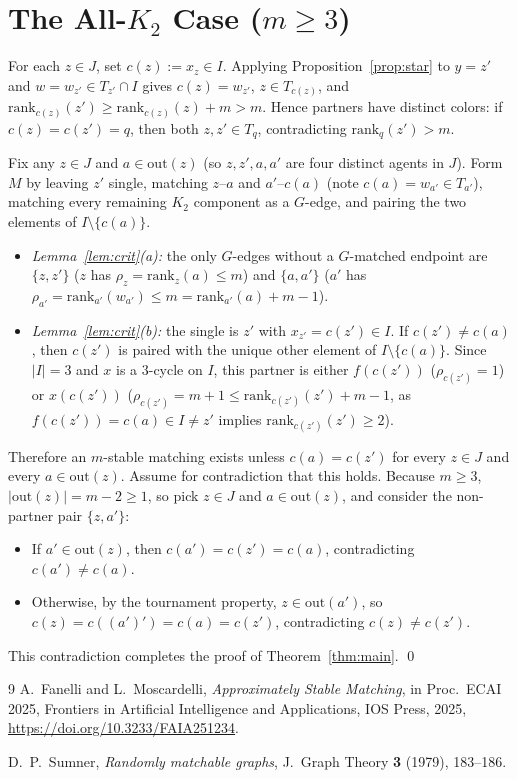 \documentclass[11pt]{article}
\begin{document}
\section{The All-$K_2$ Case ($m \ge 3$)}\label{sec:allk2}

For each $z \in J$, set $c(z) := x_z \in I$. Applying Proposition~\ref{prop:star} to $y = z'$ and $w = w_{z'} \in T_{z'} \cap I$ gives $c(z) = w_{z'}$, $z \in T_{c(z)}$, and $\mathrm{rank}_{c(z)}(z') \ge \mathrm{rank}_{c(z)}(z) + m > m$. Hence partners have distinct colors: if $c(z) = c(z') = q$, then both $z, z' \in T_q$, contradicting $\mathrm{rank}_q(z') > m$.

Fix any $z \in J$ and $a \in \mathrm{out}(z)$ (so $z, z', a, a'$ are four distinct agents in $J$). Form $M$ by leaving $z'$ single, matching $z\text{--}a$ and $a'\text{--}c(a)$ (note $c(a) = w_{a'} \in T_{a'}$), matching every remaining $K_2$ component as a $G$-edge, and pairing the two elements of $I \setminus \{c(a)\}$.
\begin{itemize}
  \item \emph{Lemma~\ref{lem:crit}(a):} the only $G$-edges without a $G$-matched endpoint are $\{z, z'\}$ ($z$ has $\rho_z = \mathrm{rank}_z(a) \le m$) and $\{a, a'\}$ ($a'$ has $\rho_{a'} = \mathrm{rank}_{a'}(w_{a'}) \le m = \mathrm{rank}_{a'}(a) + m - 1$).
  \item \emph{Lemma~\ref{lem:crit}(b):} the single is $z'$ with $x_{z'} = c(z') \in I$. If $c(z') \neq c(a)$, then $c(z')$ is paired with the unique other element of $I \setminus \{c(a)\}$. Since $|I| = 3$ and $x$ is a $3$-cycle on $I$, this partner is either $f(c(z'))$ ($\rho_{c(z')} = 1$) or $x(c(z'))$ ($\rho_{c(z')} = m+1 \le \mathrm{rank}_{c(z')}(z') + m - 1$, as $f(c(z')) = c(a) \in I \neq z'$ implies $\mathrm{rank}_{c(z')}(z') \ge 2$).
\end{itemize}

Therefore an $m$-stable matching exists unless $c(a) = c(z')$ for every $z \in J$ and every $a \in \mathrm{out}(z)$. Assume for contradiction that this holds. Because $m \ge 3$, $|\mathrm{out}(z)| = m - 2 \ge 1$, so pick $z \in J$ and $a \in \mathrm{out}(z)$, and consider the non-partner pair $\{z, a'\}$:
\begin{itemize}
  \item If $a' \in \mathrm{out}(z)$, then $c(a') = c(z') = c(a)$, contradicting $c(a') \neq c(a)$.
  \item Otherwise, by the tournament property, $z \in \mathrm{out}(a')$, so $c(z) = c((a')') = c(a) = c(z')$, contradicting $c(z) \neq c(z')$.
\end{itemize}
This contradiction completes the proof of Theorem~\ref{thm:main}. \qed

\begin{thebibliography}{9}
A.~Fanelli and L.~Moscardelli, \emph{Approximately Stable Matching}, in Proc.\ ECAI 2025, Frontiers in Artificial Intelligence and Applications, IOS Press, 2025, \url{https://doi.org/10.3233/FAIA251234}.

D.~P.~Sumner, \emph{Randomly matchable graphs}, J.\ Graph Theory \textbf{3} (1979), 183--186.
\end{thebibliography}
\end{document}
